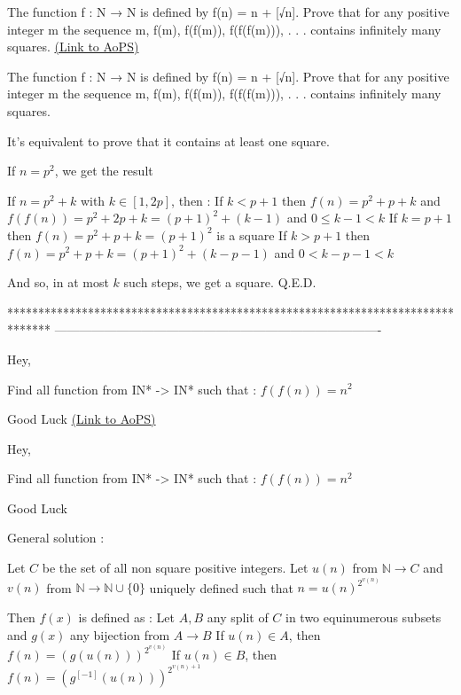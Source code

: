 \begin{problem}
	The function f : N → N is defined by f(n) = n + [√n]. Prove that
for any positive integer m the sequence m, f(m), f(f(m)), f(f(f(m))), . . .
contains infinitely many squares.
	\flushright \href{https://artofproblemsolving.com/community/c6h468872}{(Link to AoPS)}
\end{problem}



\begin{solution}
	\begin{tcolorbox}The function f : N → N is defined by f(n) = n + [√n]. Prove that
for any positive integer m the sequence m, f(m), f(f(m)), f(f(f(m))), . . .
contains infinitely many squares.\end{tcolorbox}
It's equivalent to prove that it contains at least one square.

If $n=p^2$, we get the result

If $n=p^2+k$ with $k\in[1,2p]$, then :
If $k<p+1$ then $f(n)=p^2+p+k$ and $f(f(n))=p^2+2p+k=(p+1)^2+(k-1)$ and $0\le k-1<k$
If $k=p+1$ then $f(n)=p^2+p+k=(p+1)^2$ is a square
If $k>p+1$ then $f(n)=p^2+p+k=(p+1)^2+(k-p-1)$ and $0<k-p-1<k$

And so, in at most $k$ such steps, we get a square.
Q.E.D.
\end{solution}
*******************************************************************************
-------------------------------------------------------------------------------

\begin{problem}
	Hey,

Find all function from IN* -> IN* such that :
$f(f(n))=n^{2}$

Good Luck
	\flushright \href{https://artofproblemsolving.com/community/c6h469041}{(Link to AoPS)}
\end{problem}



\begin{solution}
	\begin{tcolorbox}Hey,

Find all function from IN* -> IN* such that :
$f(f(n))=n^{2}$

Good Luck\end{tcolorbox}
General solution :

Let $C$ be the set of all non square positive integers.
Let $u(n)$ from $\mathbb N\to C$ and $v(n)$ from $\mathbb N\to \mathbb N\cup\{0\}$ uniquely defined such that $n=u(n)^{2^{v(n)}}$

Then $f(x)$ is defined as :
Let $A,B$ any split of $C$ in two equinumerous subsets and $g(x)$ any bijection from $A\to B$
If $u(n)\in A$, then $f(n)=\left(g(u(n))\right)^{2^{v(n)}}$
If $u(n)\in B$, then $f(n)=\left(g^{[-1]}(u(n))\right)^{2^{v(n)+1}}$
\end{solution}



